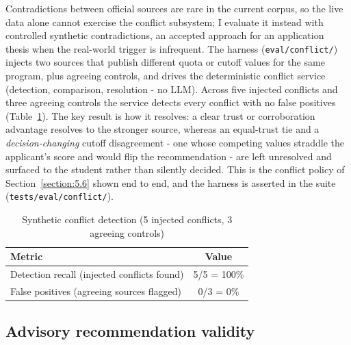\documentclass[../main.tex]{subfiles}
\begin{document}
Contradictions between official sources are rare in the current corpus, so the live data alone cannot exercise the conflict subsystem; I evaluate it instead with controlled synthetic contradictions, an accepted approach for an application thesis when the real-world trigger is infrequent.
The harness (\texttt{eval/conflict/}) injects two sources that publish different quota or cutoff values for the same program, plus agreeing controls, and drives the deterministic conflict service (detection, comparison, resolution - no \gls{LLM}).
Across five injected conflicts and three agreeing controls the service detects every conflict with no false positives (Table~\ref{table:eval-conflict}).
The key result is how it resolves: a clear trust or corroboration advantage resolves to the stronger source, whereas an equal-trust tie and a \textit{decision-changing} cutoff disagreement - one whose competing values straddle the applicant's score and would flip the recommendation - are left unresolved and surfaced to the student rather than silently decided.
This is the conflict policy of Section~\ref{section:5.6} shown end to end, and the harness is asserted in the suite (\texttt{tests/eval/conflict/}).

\begin{table}[H]
    \centering
    \caption{Synthetic conflict detection (5 injected conflicts, 3 agreeing controls)}
    \label{table:eval-conflict}
    \begin{tabular}{|p{8.5cm}|c|}
        \hline
        \textbf{Metric} & \textbf{Value} \\
        \hline
        Detection recall (injected conflicts found) & 5/5 = 100\% \\
        \hline
        False positives (agreeing sources flagged) & 0/3 = 0\% \\
        \hline
    \end{tabular}
\end{table}

\subsection{Advisory recommendation validity}
\label{subsection:4.4.7}
\end{document}
